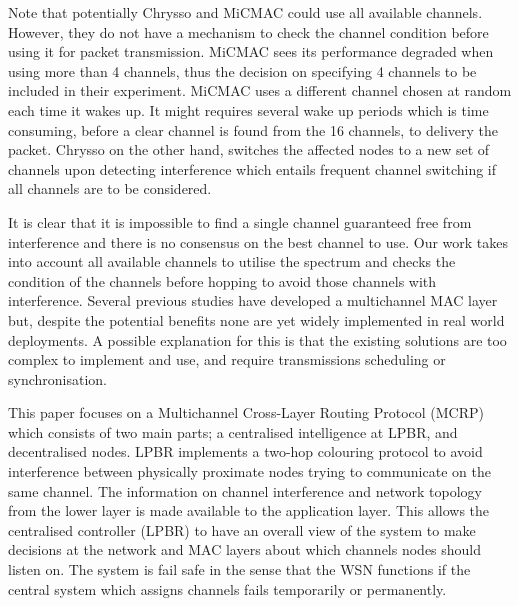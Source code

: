 Note that potentially Chrysso and MiCMAC could use all available channels.
However, they do not have a mechanism to check the channel condition before using it for packet transmission. MiCMAC sees its performance degraded when using more than 4 channels, thus the decision on specifying 4 channels to be included in their experiment. 
MiCMAC uses a different channel chosen at random each time it wakes up.
It might requires several wake up periods which is time consuming, before a clear channel is found from the 16 channels, to delivery the packet. 
Chrysso on the other hand, switches the affected nodes to a new set of channels upon detecting interference which entails frequent channel switching if all channels are to be considered.

It is clear that it is impossible to find a single channel guaranteed free from interference and there is no consensus on the best channel to use. Our work takes into account all available channels to utilise the spectrum and checks the condition of the channels before hopping to avoid those channels with interference. Several previous studies have developed a multichannel MAC layer but, despite the potential benefits none are yet widely implemented in real world deployments. 
A possible explanation for this is that the existing solutions are too complex to implement and use, and require transmissions scheduling or synchronisation. 

This paper focuses on a Multichannel Cross-Layer Routing Protocol (MCRP) which consists of two main parts; a centralised intelligence at LPBR, and decentralised nodes. LPBR implements a two-hop colouring protocol to avoid interference between physically proximate nodes trying to communicate on the same channel. The information on channel interference and network topology from the lower layer is made available to the application layer. This allows the centralised controller (LPBR) to have an overall view of the system to make decisions at the network and MAC layers about which channels nodes should listen on. The system is fail safe in the sense that the WSN functions if the central system which assigns channels fails temporarily or permanently.
 

